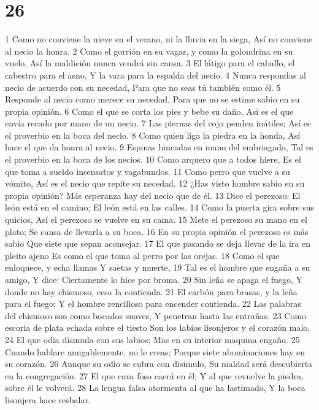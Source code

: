 \chapter{26}

1 Como no conviene la nieve en el verano, ni la lluvia en la siega,
Así no conviene al necio la honra.
2 Como el gorrión en su vagar, y como la golondrina en su vuelo,
Así la maldición nunca vendrá sin causa.
3 El látigo para el caballo, el cabestro para el asno,
Y la vara para la espalda del necio.
4 Nunca respondas al necio de acuerdo con su necedad,
Para que no seas tú también como él.
5 Responde al necio como merece su necedad,
Para que no se estime sabio en su propia opinión.
6 Como el que se corta los pies y bebe su daño,
Así es el que envía recado por mano de un necio.
7 Las piernas del cojo penden inútiles;
Así es el proverbio en la boca del necio.
8 Como quien liga la piedra en la honda,
Así hace el que da honra al necio.
9 Espinas hincadas en mano del embriagado,
Tal es el proverbio en la boca de los necios.
10 Como arquero que a todos hiere,
Es el que toma a sueldo insensatos y vagabundos.
11 Como perro que vuelve a su vómito, 
Así es el necio que repite su necedad.
12 ¿Has visto hombre sabio en su propia opinión?
Más esperanza hay del necio que de él.
13 Dice el perezoso: El león está en el camino;
El león está en las calles.
14 Como la puerta gira sobre sus quicios,
Así el perezoso se vuelve en su cama.
15 Mete el perezoso su mano en el plato;
Se cansa de llevarla a su boca.
16 En su propia opinión el perezoso es más sabio
Que siete que sepan aconsejar.
17 El que pasando se deja llevar de la ira en pleito ajeno
Es como el que toma al perro por las orejas.
18 Como el que enloquece, y echa llamas
Y saetas y muerte,
19 Tal es el hombre que engaña a su amigo,
Y dice: Ciertamente lo hice por broma.
20 Sin leña se apaga el fuego,
Y donde no hay chismoso, cesa la contienda.
21 El carbón para brasas, y la leña para el fuego;
Y el hombre rencilloso para encender contienda.
22 Las palabras del chismoso son como bocados suaves,
Y penetran hasta las entrañas.
23 Como escoria de plata echada sobre el tiesto
Son los labios lisonjeros y el corazón malo.
24 El que odia disimula con sus labios;
Mas en su interior maquina engaño.
25 Cuando hablare amigablemente, no le creas;
Porque siete abominaciones hay en su corazón.
26 Aunque su odio se cubra con disimulo,
Su maldad será descubierta en la congregación.
27 El que cava foso caerá en él;
Y al que revuelve la piedra, sobre él le volverá.
28 La lengua falsa atormenta al que ha lastimado,
Y la boca lisonjera hace resbalar.

